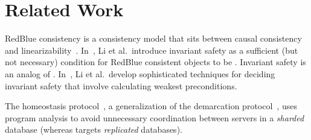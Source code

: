 \section{Related Work}

\newcommand{\sieve}{\textsc{SIEVE}}
RedBlue consistency is a consistency model that sits between causal consistency
and linearizability~\cite{li2012making}.
%
%
In~\cite{li2012making}, Li et al.\ introduce invariant safety as a
sufficient (but not necessary) condition for RedBlue consistent objects to be
\invariantconfluent{}. Invariant safety is an analog of \invariantclosure{}.
In~\cite{li2014automating}, Li et al.\ develop sophisticated techniques for
deciding invariant safety that involve calculating weakest preconditions.
%

The homeostasis protocol~\cite{roy2015homeostasis}, a generalization of the
demarcation protocol~\cite{barbara1994demarcation}, uses program analysis to
avoid unnecessary coordination between servers in a \emph{sharded} database
(whereas \invariantconfluence{} targets \emph{replicated} databases).

